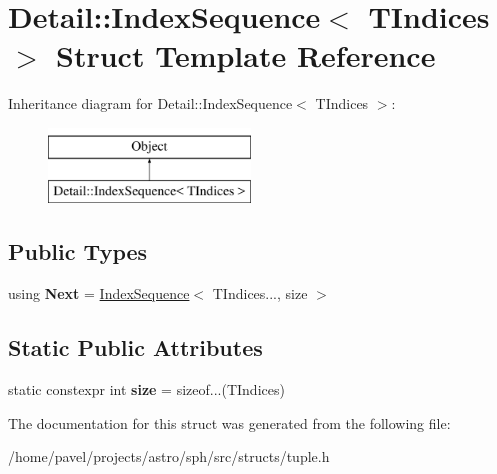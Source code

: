\hypertarget{structDetail_1_1IndexSequence}{}\section{Detail\+:\+:Index\+Sequence$<$ T\+Indices $>$ Struct Template Reference}
\label{structDetail_1_1IndexSequence}
Inheritance diagram for Detail\+:\+:Index\+Sequence$<$ T\+Indices $>$\+:\begin{figure}[H]
\begin{center}
\leavevmode
\includegraphics[height=2.000000cm]{structDetail_1_1IndexSequence}
\end{center}
\end{figure}
\subsection*{Public Types}
\begin{DoxyCompactItemize}
\item 
\hypertarget{structDetail_1_1IndexSequence_a5792e543d05c733006a36ec329c4c9ae}{}\label{structDetail_1_1IndexSequence_a5792e543d05c733006a36ec329c4c9ae} 
using {\bfseries Next} = \hyperlink{structDetail_1_1IndexSequence}{Index\+Sequence}$<$ T\+Indices..., size $>$
\end{DoxyCompactItemize}
\subsection*{Static Public Attributes}
\begin{DoxyCompactItemize}
\item 
\hypertarget{structDetail_1_1IndexSequence_a3f769b2827c48529a9d7d8b6a7e22a00}{}\label{structDetail_1_1IndexSequence_a3f769b2827c48529a9d7d8b6a7e22a00} 
static constexpr int {\bfseries size} = sizeof...(T\+Indices)
\end{DoxyCompactItemize}


The documentation for this struct was generated from the following file\+:\begin{DoxyCompactItemize}
\item 
/home/pavel/projects/astro/sph/src/structs/tuple.\+h\end{DoxyCompactItemize}
